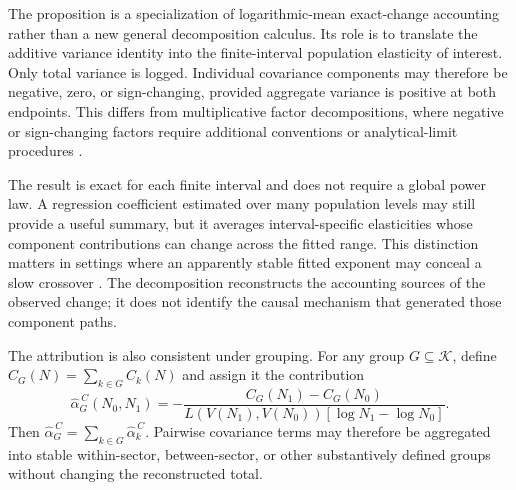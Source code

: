 {The proposition is a specialization of logarithmic-mean exact-change
accounting rather than a new general decomposition calculus. Its role is
to translate the additive variance identity into the finite-interval
population elasticity of interest. Only total variance is logged.
Individual covariance components may therefore be negative, zero, or
sign-changing, provided aggregate variance is positive at both
endpoints. This differs from multiplicative factor decompositions, where
negative or sign-changing factors require additional conventions or
analytical-limit procedures \citep{angLiu2007}.

The result is exact for each finite interval and does not require a
global power law. A regression coefficient estimated over many
population levels may still provide a useful summary, but it averages
interval-specific elasticities whose component contributions can change
across the fitted range. This distinction matters in settings where an
apparently stable fitted exponent may conceal a slow crossover
\citep{riccaboniEtAl2008}. The decomposition reconstructs the accounting
sources of the observed change; it does not identify the causal mechanism
that generated those component paths.

The attribution is also consistent under grouping. For any group
$G\subseteq\mathcal{K}$, define
$C_G(N)=\sum_{k\in G}C_k(N)$ and assign it the contribution
\begin{equation}
\label{eq:grouped_alpha_contribution}
    \widehat{\alpha}^{\,C}_G(N_0,N_1)
    =
    -\frac{C_G(N_1)-C_G(N_0)}{
        L\!\left(V(N_1),V(N_0)\right)
        [\log N_1-\log N_0]
    }.
\end{equation}
Then
$\widehat{\alpha}^{\,C}_G=\sum_{k\in G}\widehat{\alpha}^{\,C}_k$.
Pairwise covariance terms may therefore be aggregated into stable
within-sector, between-sector, or other substantively defined groups
without changing the reconstructed total.

}
